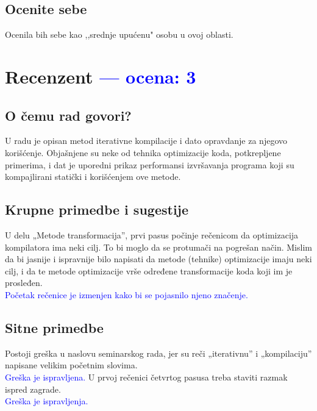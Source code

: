 \documentclass[a4paper]{report}
\newcommand{\odgovor}[1]{\textcolor{blue}{#1}}
\begin{document}
\section{Ocenite sebe}
Ocenila bih sebe kao ,,srednje upućenu" osobu u ovoj oblasti.


\chapter{Recenzent \odgovor{--- ocena: 3} }


\section{O čemu rad govori?}
U radu je opisan metod iterativne kompilacije i dato opravdanje za njegovo korišćenje. Objašnjene su neke od tehnika optimizacije koda, potkrepljene primerima, i dat je uporedni prikaz performansi izvršavanja programa koji su kompajlirani statički i korišćenjem ove metode. 

\section{Krupne primedbe i sugestije}
 

U delu „Metode transformacija”, prvi pasus počinje rečenicom da optimizacija kompilatora ima neki cilj. To bi moglo da se protumači na pogrešan način. Mislim da bi jasnije i ispravnije bilo napisati da metode (tehnike) optimizacije imaju neki cilj, i da te metode optimizacije vrše određene transformacije koda koji im je prosleđen.
\\
\odgovor{ Početak rečenice je izmenjen kako bi se pojasnilo njeno značenje. }

\section{Sitne primedbe}
Postoji greška u naslovu seminarskog rada, jer su reči „iterativnu” i „kompilaciju” napisane velikim početnim slovima.
\\
\odgovor{ Greška je ispravljena. }
U prvoj rečenici četvrtog pasusa treba staviti razmak ispred zagrade.
\\
\odgovor{ Greška je ispravljenja. }
\end{document}
